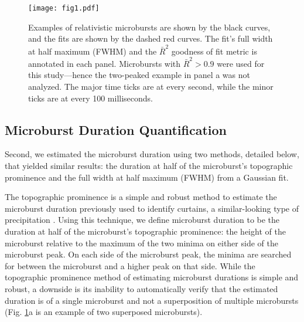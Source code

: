 \documentclass[draft]{agujournal2019}
\begin{document}
\begin{figure}
\noindent\texttt{[image: fig1.pdf]}
\caption{Examples of relativistic microbursts are shown by the black curves, and the fits are shown by the dashed red curves. The fit's full width at half maximum (FWHM) and the $\bar{R}^2$ goodness of fit metric is annotated in each panel. Microbursts with $\bar{R}^2 > 0.9$ were used for this study---hence the two-peaked example in panel a was not analyzed. The major time ticks are at every second, while the minor ticks are at every 100 milliseconds.}
\label{fig1}
\end{figure}

\subsection{Microburst Duration Quantification}
Second, we estimated the microburst duration using two methods, detailed below, that yielded similar results: the duration at half of the microburst's topographic prominence and the full width at half maximum (FWHM) from a Gaussian fit.

The topographic prominence is a simple and robust method to estimate the microburst duration previously used to identify curtains, a similar-looking type of precipitation \cite{Shumko2020b}. Using this technique, we define microburst duration to be the duration at half of the microburst's topographic prominence: the height of the microburst relative to the maximum of the two minima on either side of the microburst peak. On each side of the microburst peak, the minima are searched for between the microburst and a higher peak on that side. While the topographic prominence method of estimating microburst durations is simple and robust, a downside is its inability to automatically verify that the estimated duration is of a single microburst and not a superposition of multiple microbursts (Fig. \ref{fig1}a is an example of two superposed microbursts).
\end{document}
